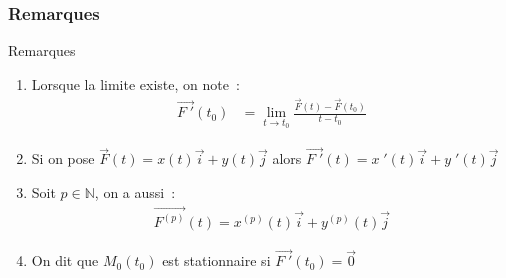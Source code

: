 \documentclass[14pt]{beamer}
\begin{document}
\subsubsection{Remarques}
\begin{frame}{}
        \begin{block}{Remarques}
                \begin{enumerate}
                        \item Lorsque la limite existe, on note~:
                \begin{align*}
                        \vec{F\;'}(t_0) & = \lim_{t\to t_0}\frac{\vec{F}(t)-\vec{F}(t_0)}{t-t_0}
                \end{align*}
        \item Si on pose $\vec{F}(t) = x(t) \vec{i} + y(t) \vec{j}$ alors
                $\vec{F\;'}(t)= x\;'(t) \vec{i} + y\;'(t) \vec{j}$
        \item Soit $p\in \mathbb{N}$, on a aussi~:
                \begin{align*}
                        \vec{F^{(p)}}(t)= x^{(p)}(t) \vec{i} + y^{(p)}(t) \vec{j}
                \end{align*}
        \item On dit que $M_0(t_0)$ est stationnaire si $\vec{F\;'}(t_0)=\vec{0}$
                \end{enumerate}
        \end{block}
\end{frame}
\end{document}
